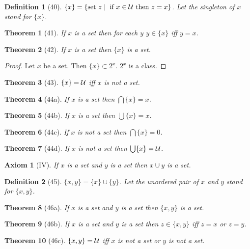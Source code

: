\documentclass{scrartcl}
\newenvironment{forthel}{\begin{leftbar}}{\end{leftbar}}
\newtheorem*{axiom}{Axiom}
\newtheorem*{theorem}{Theorem}
\newtheorem*{definition}{Definition}
\newcommand{\sing}[1]{\{{#1}\}}
\newcommand{\pair}[2]{\{{#1},{#2}\}}
\begin{document}
\begin{forthel}
\begin{definition}[40] $\sing{x} = 
\{\text{set } z \mid \text{ if } x \in {\cal U} \text{ then } z = x\}$.
Let the \emph{singleton} of $x$ stand for $\sing{x}$.
\end{definition}

\begin{theorem}[41] If $x$ is a set then 
for each $y$ $y \in \sing{x}$ iff $y = x$.
\end{theorem}

\begin{theorem}[42] If $x$ is a set then 
$\sing{x}$ is a set.
\end{theorem}
\begin{proof} Let $x$ be a set. Then $\sing{x} \subset 2^{x}$. 
$2^{x}$ is a class.
\end{proof}

\begin{theorem}[43] $\sing{x} = {\cal U}$ iff $x$ is not a set.
\end{theorem}

\begin{theorem}[44a] If $x$ is a set then $\bigcap \sing{x} = x$.
\end{theorem}
\begin{theorem}[44b] If $x$ is a set then $\bigcup \sing{x} = x$.
\end{theorem}
\begin{theorem}[44c] If $x$ is not a set then $\bigcap \sing{x} = 0$.
\end{theorem}
\begin{theorem}[44d] If $x$ is not a set then $\bigcup \sing{x} = {\cal U}$.
\end{theorem}

\begin{axiom}[IV] If $x$ is a set and $y$ is a set then $x \cup y$ is a set.
\end{axiom}

\begin{definition}[45] $\pair{x}{y} = \sing{x} \cup \sing{y}$.
Let the \emph{unordered pair} of $x$ and $y$ stand for $\pair{x}{y}$.
\end{definition}

\begin{theorem}[46a] If $x$ is a set and $y$ is a set then $\pair{x}{y}$ is a set.
\end{theorem}
\begin{theorem}[46b] If $x$ is a set and $y$ is a set then
$z \in \pair{x}{y}$ iff $z=x$ or $z=y$.
\end{theorem}
\begin{theorem}[46c] $\pair{x}{y} = {\cal U}$ iff $x$ is not a set or $y$ 
is not a set.
\end{theorem}


\end{forthel}
\end{document}
